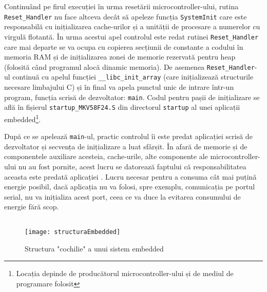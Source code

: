 \documentclass[12pt,a4paper,titlepage]{report}
\begin{document}
Continuând pe firul execuției în urma resetării microcontroller-ului, rutina \texttt{Reset\_Handler} nu face altceva decât să 
apeleze funcția \texttt{SystemInit} care este responsabilă cu inițializarea cache-urilor și a unității de procesare a numerelor cu virgulă flotantă. În urma acestui apel controlul este redat rutinei \texttt{Reset\_Handler} care mai departe se va ocupa cu copierea secțiunii de constante a codului în memoria RAM și de inițializarea zonei de memorie rezervată pentru heap (folosită când programul alocă dinamic memoria). De asemenea \texttt{Reset\_Handler}-ul continuă cu apelul funcției \texttt{\_\_libc\_init\_array} (care inițializează structurile necesare limbajului C) și în final va apela punctul unic de intrare într-un program, funcția scrisă de dezvoltator: \texttt{main}.
Codul pentru pașii de inițializare se află în fișierul \texttt{startup\_MKV58F24.S} din directorul \texttt{startup} al unei aplicații embedded\footnote{Locația depinde de producătorul microcontroller-ului și de mediul de programare folosit}.

După ce se apelează \texttt{main}-ul, practic controlul îi este predat aplicației scrisă de dezvoltator și secvența de inițializare a luat sfârșit. În afară de memorie și de componentele auxiliare acesteia, cache-urile, alte componente ale microcontroller-ului nu au fost pornite, acest lucru se datorează faptului că responsabilitatea aceasta este predată aplicației . Lucru necesar pentru a consuma cât mai puțină energie posibil, dacă aplicația nu va folosi, spre exemplu, comunicația pe portul serial, nu va inițializa acest port, ceea ce va duce la evitarea consumului de energie fără scop.

\inputminted{asm}{reset_handler.s}

\begin{figure}[h]
    \centering
    \texttt{[image: structuraEmbedded]}
    \caption{Structura "cochilie" a unui sistem embedded}
    \label{shellEmbedded}
\end{figure}
\end{document}
